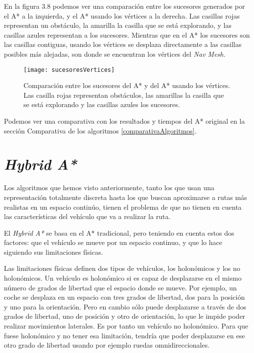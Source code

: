 En la figura 3.8 podemos ver una comparación entre los sucesores generados por el A* a la izquierda, y el A* usando los vértices a la derecha. Las casillas rojas representan un obstáculo, la amarilla la casilla que se está explorando, y las casillas azules representan a los sucesores. Mientras que en el A* los sucesores son las casillas contiguas, usando los vértices se desplaza directamente a las casillas posibles más alejadas, son donde se encuentran los vértices del \textit{Nav Mesh.}
\begin{figure}[htpb]
    \centering
    \texttt{[image: sucesoresVertices]}
    \caption[Comparación entre los sucesores del A* y del A* usando los vértices]{Comparación entre los sucesores del A* y del A* usando los vértices. Las casilla rojas representan obstáculos, las amarillas la casilla que se está explorando y las casillas azules los sucesores.}
    \label{fig:basics AFM sketch}
\end{figure}

Podemos ver una comparativa con los resultados y tiempos del A* original en la sección Comparativa de los algoritmos \ref{comparativaAlgoritmos}.

\section{\textit{Hybrid A*}}
Los algoritmos que hemos visto anteriormente, tanto los que usan una representación totalmente discreta hasta los que buscan aproximarse a rutas más realistas en un espacio continúo, tienen el problema de que no tienen en cuenta las características del vehículo que va a realizar la ruta.

El \textit{Hybrid A*}\cite{dolgov08gppISER,dolgov08gppSTAIR} se basa en el A* tradicional, pero teniendo en cuenta estos dos factores: que el vehículo se mueve por un espacio continuo, y que lo hace siguiendo sus limitaciones físicas.

Las limitaciones físicas definen dos tipos de vehículos, los holonómicos y los no holonómicos. Un vehículo es holonómico si es capaz de desplazarse en el mismo número de grados de libertad que el espacio donde se mueve. Por ejemplo, un coche se desplaza en un espacio con tres grados de libertad, dos para la posición y uno para la orientación. Pero en cambio sólo puede desplazarse a través de dos grados de libertad, uno de posición y otro de orientación, lo que le impide poder realizar movimientos laterales. Es por tanto un vehículo no holonómico. Para que fuese holonómico y no tener esa limitación, tendría que poder desplazarse en ese otro grado de libertad usando por ejemplo ruedas omnidireccionales.

